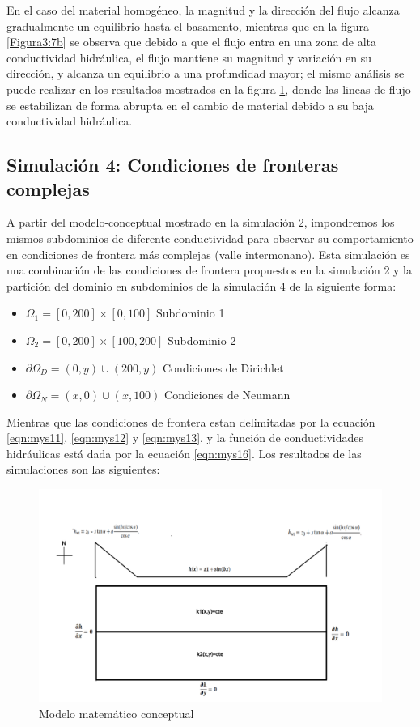 En el caso del material homogéneo, la magnitud y la dirección del flujo alcanza gradualmente un equilibrio hasta el basamento, mientras que en la figura \ref{Figura3:7b} se observa que debido a que el flujo entra en una zona de alta conductividad hidráulica, el flujo mantiene su magnitud y variación en su dirección, y alcanza un equilibrio a una profundidad mayor; el mismo análisis se puede realizar en los resultados mostrados en la figura \ref{Figura3:7a}, donde las lineas de flujo se estabilizan de forma abrupta en el cambio de material debido a su baja conductividad hidráulica. 

\subsection{Simulación 4: Condiciones de fronteras complejas}

A partir del modelo-conceptual mostrado en la simulación 2, impondremos los mismos subdominios de diferente conductividad para observar su comportamiento en condiciones de frontera más complejas (valle intermonano). Esta simulación es una combinación de las condiciones de frontera propuestos en la simulación 2  y la partición del dominio en subdominios de la simulación 4 de la siguiente forma:

\begin{itemize}
\item  ${\Omega}_{1}=[0,200]{\times}[0,100]$ Subdominio 1
\item  ${\Omega}_{2}=[0,200]{\times}[100,200]$ Subdominio 2
\item  ${\partial}\Omega_{D}={(0,y){\cup}(200,y)}$ Condiciones de Dirichlet
\item  ${\partial}\Omega_{N}={(x,0){\cup}(x,100)}$ Condiciones de Neumann
\end{itemize}

Mientras que las condiciones de frontera estan delimitadas por la ecuación \ref{eqn:mys11}, \ref{eqn:mys12} y \ref{eqn:mys13}, y la función de conductividades hidráulicas está dada por la ecuación \ref{eqn:mys16}. Los resultados de las simulaciones son las siguientes:

\begin{figure}[H]
\centering
\includegraphics[scale=0.22]{Figura_29b.png}
\caption{ Modelo matemático conceptual}
\label{Figura3:7a}
\end{figure}

